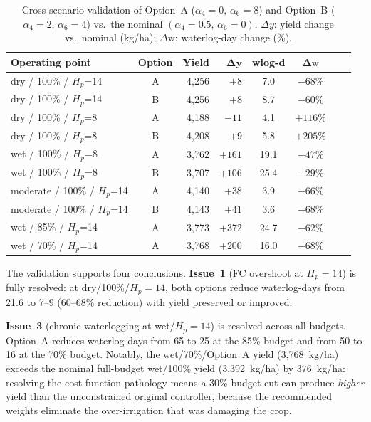 \begin{table}[h]
\centering
\caption{Cross-scenario validation of Option~A ($\alpha_4=0,\,\alpha_6=8$)
and Option~B ($\alpha_4=2,\,\alpha_6=4$) vs.\ the nominal
$(\alpha_4=0.5,\,\alpha_6=0)$.
$\Delta y$: yield change vs.\ nominal (kg/ha);
$\Delta\mathrm{w}$: waterlog-day change (\%).}
\label{tab:sweep-validation}
\begin{tabular}{lcrr cc rr}
\toprule
\textbf{Operating point} & \textbf{Option}
  & \textbf{Yield} & $\boldsymbol{\Delta y}$
  & \textbf{wlog-d} & $\boldsymbol{\Delta\mathrm{w}}$ \\
\midrule
dry / 100\% / $H_p$=14 & A & 4{,}256 & $+8$   & 7.0  & $-68\%$ \\
dry / 100\% / $H_p$=14 & B & 4{,}256 & $+8$   & 8.7  & $-60\%$ \\
dry / 100\% / $H_p$=8  & A & 4{,}188 & $-11$  & 4.1  & $+116\%$ \\
dry / 100\% / $H_p$=8  & B & 4{,}208 & $+9$   & 5.8  & $+205\%$ \\
wet / 100\% / $H_p$=8  & A & 3{,}762 & $+161$ & 19.1 & $-47\%$ \\
wet / 100\% / $H_p$=8  & B & 3{,}707 & $+106$ & 25.4 & $-29\%$ \\
moderate / 100\% / $H_p$=14 & A & 4{,}140 & $+38$  & 3.9 & $-66\%$ \\
moderate / 100\% / $H_p$=14 & B & 4{,}143 & $+41$  & 3.6 & $-68\%$ \\
wet / 85\% / $H_p$=14 & A  & 3{,}773 & $+372$ & 24.7 & $-62\%$ \\
wet / 70\% / $H_p$=14 & A  & 3{,}768 & $+200$ & 16.0 & $-68\%$ \\
\bottomrule
\end{tabular}
\end{table}

The validation supports four conclusions. \textbf{Issue~1} (FC overshoot at
$H_p = 14$) is fully resolved: at dry/100\%/$H_p=14$, both options reduce
waterlog-days from 21.6 to 7--9 (60--68\% reduction) with yield preserved
or improved.

\textbf{Issue~3} (chronic waterlogging at wet/$H_p = 14$) is resolved
across all budgets. Option~A reduces waterlog-days from 65 to 25 at the 85\%
budget and from 50 to 16 at the 70\% budget. Notably, the wet/70\%/Option~A
yield (3{,}768~kg/ha) exceeds the nominal full-budget wet/100\% yield
(3{,}392~kg/ha) by 376~kg/ha: resolving the cost-function pathology means a
30\% budget cut can produce \emph{higher} yield than the unconstrained
original controller, because the recommended weights eliminate the
over-irrigation that was damaging the crop.

